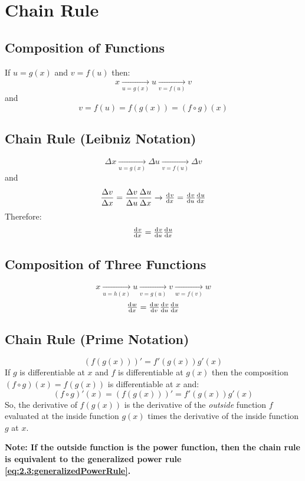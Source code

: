 \section{Chain Rule}
\subsection{Composition of Functions}
	If $u=g(x)$ and $v=f(u)$ then:
	\[x \xrightarrow[u=g(x)]{} u \xrightarrow[v=f(u)]{} v\]
	and
	\[v = f(u) = f(g(x)) = (f \circ g)(x)\]
\subsection{Chain Rule (Leibniz Notation)}
	\[\Delta x \xrightarrow[u=g(x)]{} \Delta u \xrightarrow[v=f(u)]{} \Delta v\]
	and
	\[\frac{\Delta v}{\Delta x} = \frac{\Delta v}{\Delta u} \frac{\Delta u}{\Delta x} \rightarrow \od{v}{x} = \od{v}{u} \od {u}{x}\]
	Therefore:
	\[\od{v}{x} = \od{v}{u} \od {u}{x}\]
\subsection{Composition of Three Functions}
	\[x \xrightarrow[u=h(x)]{} u \xrightarrow[v=g(u)]{} v \xrightarrow[w=f(v)]{} w\]
	\[\od{w}{x} = \od{w}{v} \od{v}{u} \od{u}{x}\]
\subsection{Chain Rule (Prime Notation)}
	\[\left( f(g(x)) \right)' = f'(g(x))g'(x)\]
	If $g$ is differentiable at $x$ and $f$ is differentiable at $g(x)$ then the composition $(f \circ g)(x) = f(g(x))$ is differentiable at $x$ and:
	\[(f \circ g)'(x) = \left( f(g(x)) \right)' = f'(g(x))g'(x)\]
	So, the derivative of $f(g(x))$ is the derivative of the \emph{outside} function $f$ evaluated at the inside function $g(x)$ times the derivative of the inside function $g$ at $x$.

	\textbf{Note: If the outside function is the power function, then the chain rule is equivalent to the generalized power rule \eqref{eq:2.3:generalizedPowerRule}.}
